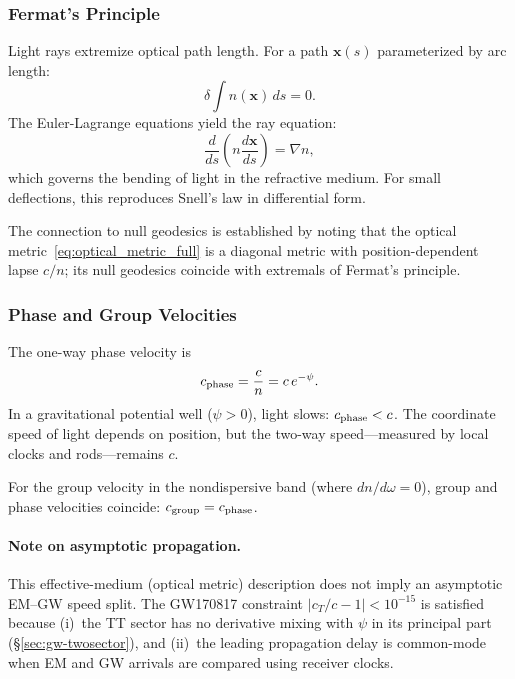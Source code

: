 \subsubsection{Fermat's Principle}

Light rays extremize optical path length. For a path $\mathbf{x}(s)$ 
parameterized by arc length:
\begin{equation}
\delta \int n(\mathbf{x})\,ds = 0.
\label{eq:fermat}
\end{equation}
The Euler-Lagrange equations yield the ray equation:
\begin{equation}
\frac{d}{ds}\left(n\frac{d\mathbf{x}}{ds}\right) = \nabla n,
\end{equation}
which governs the bending of light in the refractive medium. For small 
deflections, this reproduces Snell's law in differential form.

The connection to null geodesics is established by noting that the 
optical metric~\eqref{eq:optical_metric_full} is a diagonal metric 
with position-dependent lapse $c/n$; its null geodesics coincide 
with extremals of Fermat's principle.

\subsubsection{Phase and Group Velocities}

The one-way phase velocity is
\begin{equation}
c_{\rm phase} = \frac{c}{n} = c\,e^{-\psi}.
\end{equation}
In a gravitational potential well ($\psi > 0$), light slows: $c_{\rm phase} < c$. 
The coordinate speed of light depends on position, but the two-way 
speed---measured by local clocks and rods---remains $c$.

For the group velocity in the nondispersive band (where $dn/d\omega = 0$), 
group and phase velocities coincide: $c_{\rm group} = c_{\rm phase}$.

\paragraph{Note on asymptotic propagation.}
This effective-medium (optical metric) description does not imply an 
asymptotic EM--GW speed split. The GW170817 constraint 
$|c_T/c - 1| < 10^{-15}$ is satisfied because (i)~the TT sector has 
no derivative mixing with $\psi$ in its principal part 
(\S\ref{sec:gw-twosector}), and (ii)~the leading propagation delay 
is common-mode when EM and GW arrivals are compared using receiver clocks.

